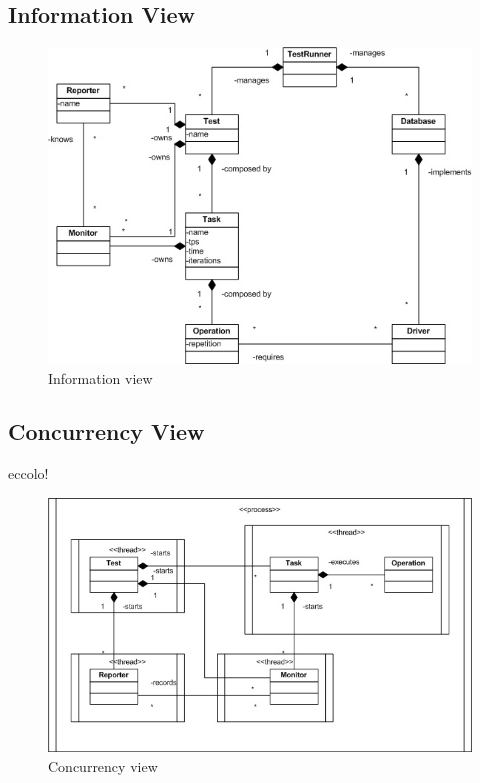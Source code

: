 		\subsection{Information View}






\begin{figure}[htp!] 
	\begin{center}
		\includegraphics[width=13cm]{img/uml.jpg}	
	\end{center}
	\caption{Information view}
	\label{information-view}	
\end{figure}
		
		\subsection{Concurrency View}
				eccolo!
\begin{figure}[htp!] 
	\begin{center}
		\includegraphics[width=13cm]{img/concorrenza.jpg}	
	\end{center}
	\caption{Concurrency view}
	\label{concurrency-view}	
\end{figure}
		

